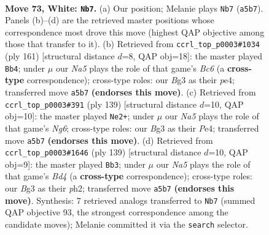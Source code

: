 \documentclass[11pt]{article}
\begin{document}
\clearpage

\begin{figure}[p]\centering
\begin{subfigure}{0.46\textwidth}\centering
\resizebox{\linewidth}{!}{%
\newchessgame
\chessboard[
  setfen={7k/2P5/8/N1r5/8/6B1/4K3/8 w - - 59 73},
  showmover=false,
  pgfstyle=straightmove, color=movearrow, markmove={a5-b7}
]}
\caption{}
\end{subfigure}\hfill
\begin{subfigure}{0.46\textwidth}\centering
\resizebox{\linewidth}{!}{%
\newchessgame
\chessboard[
  setfen={5k2/8/8/2R5/4P3/2b5/3pK3/8 b - - 37 81},
  showmover=false,
  pgfstyle=straightmove, color=movearrow, markmove={c3-b4}
]}
\caption{}
\end{subfigure}
\\[4pt]
\begin{subfigure}{0.46\textwidth}\centering
\resizebox{\linewidth}{!}{%
\newchessgame
\chessboard[
  setfen={8/8/5p2/8/4p3/6nR/8/2K1k3 b - - 17 70},
  showmover=false,
  pgfstyle=straightmove, color=movearrow, markmove={g3-e2}
]}
\caption{}
\end{subfigure}\hfill
\begin{subfigure}{0.46\textwidth}\centering
\resizebox{\linewidth}{!}{%
\newchessgame
\chessboard[
  setfen={8/7k/3R4/3b4/8/8/p6P/K7 b - - 3 70},
  showmover=false,
  pgfstyle=straightmove, color=movearrow, markmove={d5-b3}
]}
\caption{}
\end{subfigure}
\caption{\textbf{Move 73, White: \texttt{Nb7}.} (a) Our position; Melanie plays \texttt{Nb7} (\texttt{a5b7}). Panels (b)--(d) are the retrieved master positions whose correspondence most drove this move (highest QAP objective among those that transfer to it). (b) Retrieved from \texttt{ccrl\_top\_p0003\#1034} (ply 161) [structural distance $d$=8, QAP obj=18]: the master played \texttt{Bb4}; under $\mu$ our \emph{Na5} plays the role of that game's \emph{Bc6} (a \textbf{cross-type} correspondence); cross-type roles: our \emph{B}g3 as their \emph{p}e4; transferred move \texttt{a5b7} \textbf{(endorses this move)}. (c) Retrieved from \texttt{ccrl\_top\_p0003\#391} (ply 139) [structural distance $d$=10, QAP obj=10]: the master played \texttt{Ne2+}; under $\mu$ our \emph{Na5} plays the role of that game's \emph{Ng6}; cross-type roles: our \emph{B}g3 as their \emph{P}e4; transferred move \texttt{a5b7} \textbf{(endorses this move)}. (d) Retrieved from \texttt{ccrl\_top\_p0003\#1646} (ply 139) [structural distance $d$=10, QAP obj=9]: the master played \texttt{Bb3}; under $\mu$ our \emph{Na5} plays the role of that game's \emph{Bd4} (a \textbf{cross-type} correspondence); cross-type roles: our \emph{B}g3 as their \emph{p}h2; transferred move \texttt{a5b7} \textbf{(endorses this move)}. Synthesis: 7 retrieved analogs transferred to \texttt{Nb7} (summed QAP objective 93, the strongest correspondence among the candidate moves); Melanie committed it via the \texttt{search} selector.}
\label{fig:thought-m144}
\end{figure}
\end{document}
